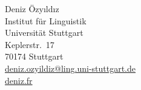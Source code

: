 \documentclass[11pt, a4paper]{article} %
\newcommand{\years}[1]{\marginnote{\scriptsize #1}} %
\begin{document}


{\LARGE Deniz \"Ozy\i ld\i z}\\[.5em] %
\years{
} Institut f\"ur Linguistik \\
Universit\"at Stuttgart \\
Keplerstr.\ 17 \\
70174 Stuttgart \\[.25em]
\years{
} \href{mailto:deniz.ozyildiz@ling.uni-stuttgart.de}{deniz.ozyildiz@ling.uni-stuttgart.de}\\ %
\years{
} \href{deniz.fr}{deniz.fr} %





%

%
%
\end{document}
